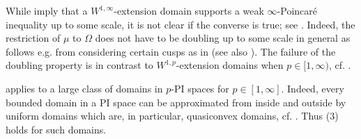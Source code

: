 \documentclass[reqno]{amsart}
\numberwithin{equation}{section}
\theoremstyle{remark}
\begin{document}
While  imply that a $W^{1,\infty}$-extension domain supports a weak $\infty$-Poincaré inequality up to some scale, it is not clear if the converse is true; see . Indeed, the restriction of $\mu$ to $\Omega$ does not have to be doubling up to some scale in general as follows e.g. from considering certain cusps as in  (see also \cite{BKZheng}). The failure of the doubling property is in contrast to $W^{1,p}$-extension domains when $p \in [1,\infty)$, cf. \cite{HKT2008:B,HKT2008}.

 applies to a large class of domains in $p$-PI spaces for $p \in [1,\infty]$. Indeed, every bounded domain in a PI space can be approximated from inside and outside by uniform domains which are, in particular, quasiconvex domains, cf. \cite{Raj:21}. Thus  (3) holds for such domains.
\end{document}
